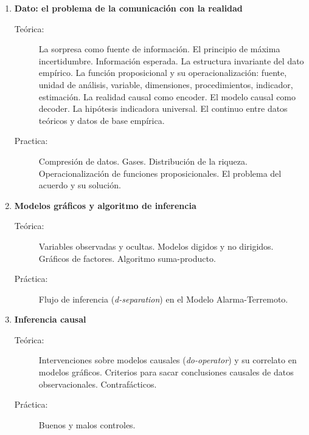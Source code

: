\documentclass[10pt]{article}
\begin{document}
\begin{enumerate}
\vspace{0.1cm}
\item \textbf{Dato: el problema de la comunicación con la realidad}
\vspace{-0.15cm}
\begin{description}
\item[Teórica:] La sorpresa como fuente de información. El principio de máxima incertidumbre. Información esperada. La estructura invariante del dato empírico. La función proposicional y su operacionalización: fuente, unidad de análisis, variable, dimensiones, procedimientos, indicador, estimación. La realidad causal como encoder. El modelo causal como decoder. La hipótesis indicadora universal. El continuo entre datos teóricos y datos de base empírica.
\item[Practica:] Compresión de datos. Gases. Distribución de la riqueza. Operacionalización de funciones proposicionales. El problema del acuerdo y su solución.
\end{description}

\vspace{0.1cm}
\item \textbf{Modelos gráficos y algoritmo de inferencia}
\vspace{-0.15cm}
\begin{description}
\item[Teórica:] Variables observadas y ocultas. Modelos digidos y no dirigidos. Gráficos de factores. Algoritmo suma-producto. 
\item[Práctica:] Flujo de inferencia (\emph{d-separation}) en el Modelo Alarma-Terremoto.
\end{description}


\vspace{0.1cm}
\item \textbf{Inferencia causal}
\vspace{-0.15cm}
\begin{description}
\item[Teórica:] Intervenciones sobre modelos causales (\emph{do-operator}) y su correlato en modelos gráficos. Criterios para sacar conclusiones causales de datos observacionales. Contrafácticos. 
\item[Práctica:] Buenos y malos controles.
\end{description}


\end{enumerate}
\end{document}
